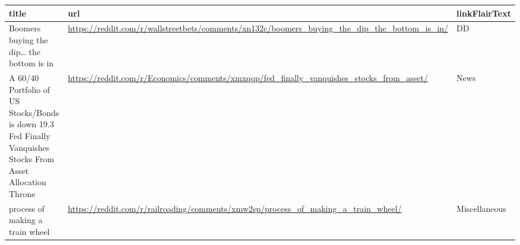 \documentclass{article}%
\begin{document}
\begin{table}[htbp]%
\centering%
\begin{adjustbox}{width=1\textwidth}%
\begin{tabular}{lll}
\toprule
                                                                                                                  title &                                                                                                                                                                                                                               url & linkFlairText \\
\midrule
                                                                               Boomers buying the dip… the bottom is in &                   \href{https://reddit.com/r/wallstreetbets/comments/xn132c/boomers\_buying\_the\_dip\_the\_bottom\_is\_in/}{https://reddit.com/r/wallstreetbets/comments/xn132c/boomers\_buying\_the\_dip\_the\_bottom\_is\_in/} &            DD \\
A 60/40 Portfolio of US Stocks/Bonds is down 19.3%
                                                             Fed Finally Vanquishes Stocks From Asset Allocation Throne &                               \href{https://reddit.com/r/Economics/comments/xmxqqp/fed\_finally\_vanquishes\_stocks\_from\_asset/}{https://reddit.com/r/Economics/comments/xmxqqp/fed\_finally\_vanquishes\_stocks\_from\_asset/} &          News \\
                                                                                        process of making a train wheel &                                             \href{https://reddit.com/r/railroading/comments/xmw2sp/process\_of\_making\_a\_train\_wheel/}{https://reddit.com/r/railroading/comments/xmw2sp/process\_of\_making\_a\_train\_wheel/} & Miscellaneous \\
\bottomrule
\end{tabular}
%
\end{adjustbox}%
\end{table}

%
\end{document}
